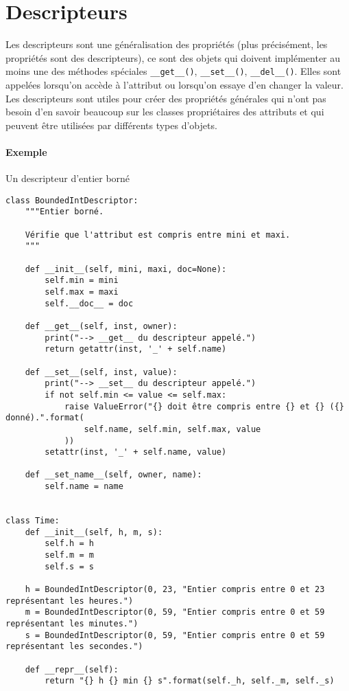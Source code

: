 \section{Descripteurs}
Les descripteurs sont une généralisation des propriétés (plus précisément, les propriétés sont des descripteurs), ce sont
des objets qui doivent implémenter au moins une des méthodes spéciales \texttt{__get__()}, \texttt{__set__()}, \texttt{__del__()}. Elles sont appelées lorsqu'on accède à l'attribut ou lorsqu'on essaye d'en
changer la valeur. Les descripteurs sont utiles pour créer des \og propriétés générales \fg{} qui n'ont pas besoin d'en savoir
beaucoup sur les classes propriétaires des attributs et qui peuvent être utilisées par différents types d'objets.

\paragraph{Exemple} Un descripteur d'entier borné
\begin{verbatim}
class BoundedIntDescriptor:
    """Entier borné.
    
    Vérifie que l'attribut est compris entre mini et maxi.
    """
    
    def __init__(self, mini, maxi, doc=None):
        self.min = mini
        self.max = maxi
        self.__doc__ = doc

    def __get__(self, inst, owner):
        print("--> __get__ du descripteur appelé.")
        return getattr(inst, '_' + self.name)

    def __set__(self, inst, value):
        print("--> __set__ du descripteur appelé.")
        if not self.min <= value <= self.max:
            raise ValueError("{} doit être compris entre {} et {} ({} donné).".format(
                self.name, self.min, self.max, value
            ))
        setattr(inst, '_' + self.name, value)
    
    def __set_name__(self, owner, name):
        self.name = name


class Time:
    def __init__(self, h, m, s):
        self.h = h
        self.m = m
        self.s = s

    h = BoundedIntDescriptor(0, 23, "Entier compris entre 0 et 23 représentant les heures.")
    m = BoundedIntDescriptor(0, 59, "Entier compris entre 0 et 59 représentant les minutes.")
    s = BoundedIntDescriptor(0, 59, "Entier compris entre 0 et 59 représentant les secondes.")

    def __repr__(self):
        return "{} h {} min {} s".format(self._h, self._m, self._s)
\end{verbatim}

